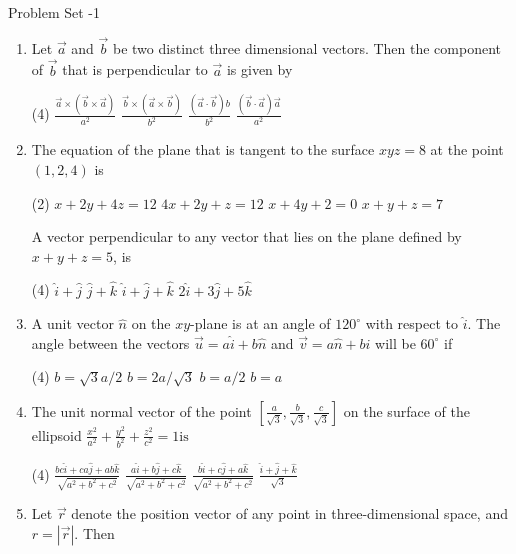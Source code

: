 \newpage
\pagestyle{plain}
\begin{abox}
	Problem Set -1
\end{abox}	
\begin{enumerate}[label=\color{ocre}\textbf{\arabic*.}]
		\item Let $\vec{a}$ and $\vec{b}$ be two distinct three dimensional vectors. Then the component of $\vec{b}$ that is perpendicular to $\vec{a}$ is given by
	{}
	\begin{tasks}(4)
		\task[\textbf{A.}] $\frac{\vec{a} \times(\vec{b} \times \vec{a})}{a^{2}}$
		\task[\textbf{B.}] $\frac{\vec{b} \times(\vec{a} \times \vec{b})}{b^{2}}$
		\task[\textbf{C.}] $\frac{(\vec{a} \cdot \vec{b}) b}{b^{2}}$
		\task[\textbf{D.}] $\frac{(\vec{b} \cdot \vec{a}) \vec{a}}{a^{2}}$
	\end{tasks}
\item The equation of the plane that is tangent to the surface $x y z=8$ at the point $(1,2,4)$ is
{}

\begin{tasks}(2)
	\task[\textbf{A.}] $x+2 y+4 z=12$
	\task[\textbf{B.}] $4 x+2 y+z=12$
	\task[\textbf{C.}] $x+4 y+2=0$
	\task[\textbf{D.}] $x+y+z=7$
\end{tasks}
A vector perpendicular to any vector that lies on the plane defined by $x+y+z=5$, is
{}
\begin{tasks}(4)
	\task[\textbf{A.}] $\hat{i}+\hat{j}$
	\task[\textbf{B.}] $\hat{j}+\hat{k}$
	\task[\textbf{C.}] $\hat{i}+\hat{j}+\hat{k}$
	\task[\textbf{D.}] $2 \hat{i}+3 \hat{j}+5 \hat{k}$
\end{tasks}
	\item A unit vector $\hat{n}$ on the $x y$-plane is at an angle of $120^{\circ}$ with respect to $\hat{i}$. The angle between the vectors $\vec{u}=a \hat{i}+b \hat{n}$ and $\vec{v}=a \hat{n}+b \hat{i}$ will be $60^{\circ}$ if
{}
\begin{tasks}(4)
	\task[\textbf{A.}] $b=\sqrt{3} a / 2$
	\task[\textbf{B.}] $b=2 a / \sqrt{3}$
	\task[\textbf{C.}] $b=a / 2$
	\task[\textbf{D.}] $b=a$
\end{tasks}
	\item The unit normal vector of the point $\left[\frac{a}{\sqrt{3}}, \frac{b}{\sqrt{3}}, \frac{c}{\sqrt{3}}\right]$ on the surface of the ellipsoid $\frac{x^{2}}{a^{2}}+\frac{y^{2}}{b^{2}}+\frac{z^{2}}{c^{2}}=1 \mathrm{is}$
{}

\begin{tasks}(4)
	\task[\textbf{A.}] $\frac{b c \hat{i}+c a \hat{j}+a b \hat{k}}{\sqrt{a^{2}+b^{2}+c^{2}}}$
	\task[\textbf{B.}] $\frac{a \hat{i}+b \hat{j}+c \hat{k}}{\sqrt{a^{2}+b^{2}+c^{2}}}$
	\task[\textbf{C.}] $\frac{b \hat{i}+c \hat{j}+a \hat{k}}{\sqrt{a^{2}+b^{2}+c^{2}}}$
	\task[\textbf{D.}] $\frac{\hat{i}+\hat{j}+\hat{k}}{\sqrt{3}}$
\end{tasks}
\item Let $\vec{r}$ denote the position vector of any point in three-dimensional space, and $r=|\vec{r}|$. Then
{	}


\end{enumerate}
